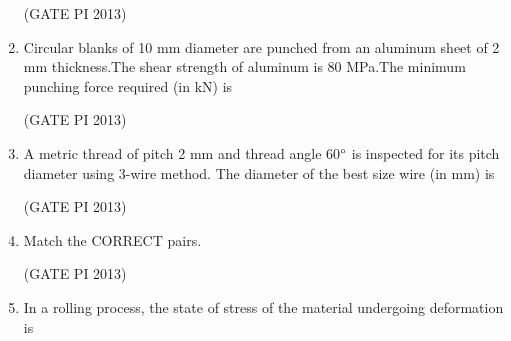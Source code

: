\documentclass[journal,12pt,onecolumn]{IEEEtran}
\theoremstyle{remark}
\begin{document}
\begin{enumerate}
\hfill (GATE PI 2013)

\item Circular blanks of 10 mm diameter are punched from an aluminum sheet of 2 mm thickness.The 
shear strength of aluminum is 80 MPa.The minimum punching force required (in kN) is

\begin{enumerate}
\end{enumerate}

\hfill (GATE PI 2013)

\item A metric thread of pitch 2 mm and thread angle 60$\degree $ is inspected for its pitch diameter using 3-wire 
method. The diameter of the best size wire (in mm) is 

\begin{enumerate}
\end{enumerate}

\hfill (GATE PI 2013)

\item Match the CORRECT pairs. 



\begin{enumerate}
\end{enumerate}

\hfill (GATE PI 2013)

\item In a rolling process, the state of stress of the material undergoing deformation is 
\begin{enumerate}
\end{enumerate}


\end{enumerate}
\end{document}
